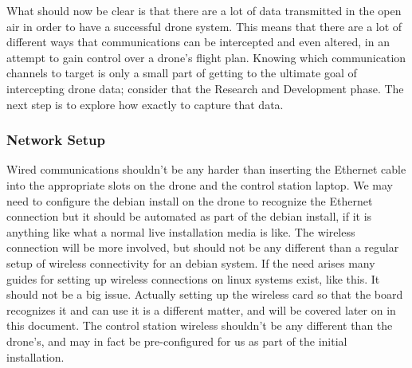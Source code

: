 \documentclass[IEEEtran,letterpaper,10pt,notitlepage,draftclsnofoot,onecolumn]{article}
\begin{document}
What should now be clear is that there are a lot of data transmitted in the open air in order to have a successful
drone system. This means that there are a lot of different ways that communications can be intercepted and even
altered, in an attempt to gain control over a drone's flight plan. Knowing which communication channels to target
is only a small part of getting to the ultimate goal of intercepting drone data; consider that the Research and
Development phase. The next step is to explore how exactly to capture that data.

\subsubsection{Network Setup}
Wired communications shouldn't be any harder than inserting the Ethernet cable into the appropriate slots on the drone and the control station laptop. 
We may need to configure the debian install on the drone to recognize the Ethernet connection but it should be automated as part of the debian install, if it is anything like what a normal live installation media is like.
The wireless connection will be more involved, but should not be any different than a regular setup of wireless connectivity for an debian system. 
If the need arises many guides for setting up wireless connections on linux systems exist, like this. \cite{wirelessconfig} 
It should not be a big issue. 
Actually setting up the wireless card so that the board recognizes it and can use it is a different matter, and will be covered later on in this document. 
The control station wireless shouldn't be any different than the drone's, and may in fact be pre-configured for us as part of the initial installation.
\end{document}
